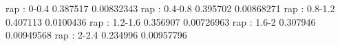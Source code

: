 rap : 0-0.4
0.387517 0.00832343
rap : 0.4-0.8
0.395702 0.00868271
rap : 0.8-1.2
0.407113 0.0100436
rap : 1.2-1.6
0.356907 0.00726963
rap : 1.6-2
0.307946 0.00949568
rap : 2-2.4
0.234996 0.00957796
